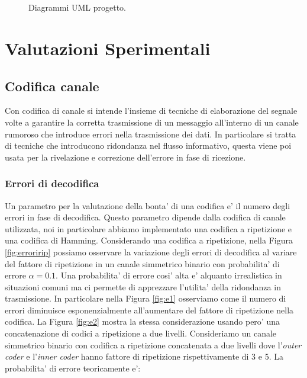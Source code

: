 \documentclass[a4paper,11pt]{article}
\theoremstyle{definition}
\begin{document}
\begin{figure}
	\centering
	 \\
	 \\
	\caption{Diagrammi UML progetto.}
	\label{fig:uml}	
\end{figure}



\clearpage

\section{Valutazioni Sperimentali}
\subsection{Codifica canale}
Con codifica di canale si intende l'insieme di tecniche di elaborazione del segnale volte a garantire la corretta trasmissione di un messaggio all'interno di un canale rumoroso che introduce errori nella trasmissione dei dati. In particolare si tratta di tecniche che introducono ridondanza nel flusso informativo, questa viene poi usata per la rivelazione e correzione dell'errore in fase di ricezione.

\subsubsection{Errori di decodifica}
Un parametro per la valutazione della bonta' di una codifica e' il numero degli errori in fase di decodifica. Questo parametro dipende dalla codifica di canale utilizzata, noi in particolare abbiamo implementato una codifica a ripetizione e una codifica di Hamming. Considerando una codifica a ripetizione, nella Figura \ref{fig:erroririp} possiamo osservare la variazione degli errori di decodifica al variare del fattore di ripetizione in un canale simmetrico binario con probabilita' di errore $\alpha=0.1$. Una probabilita' di errore cosi' alta e' alquanto irrealistica in situazioni comuni ma ci permette di apprezzare l'utilita' della ridondanza in trasmissione. In particolare nella Figura \ref{fig:e1} osserviamo come il numero di errori diminuisce esponenzialmente all'aumentare del fattore di ripetizione nella codifica. La Figura \ref{fig:e2} mostra la stessa considerazione usando pero' una concatenazione di codici a ripetizione a due livelli.
\newline \newline
\noindent Consideriamo un canale simmetrico binario con codifica a ripetizione concatenata a due livelli dove l'\textit{outer coder} e l'\textit{inner coder} hanno fattore di ripetizione rispettivamente di 3 e 5. La probabilita' di errore teoricamente e':
\end{document}

